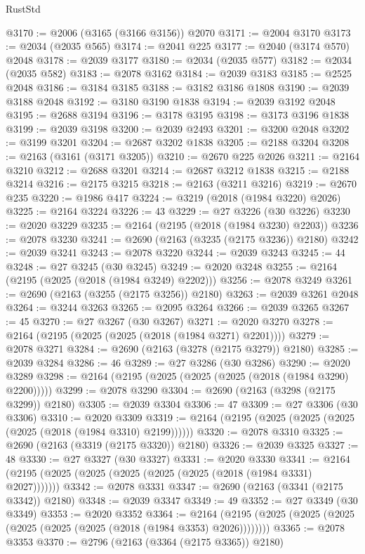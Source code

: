 \begin{lexlean}{RustStd}
\begin{coremodule}
@3170 := @2006 (@3165 (@3166 @3156)) @2070
@3171 := @2004 @3170
@3173 := @2034 (@2035 @565)
@3174 := @2041 @225
@3177 := @2040 (@3174 @570) @2048
@3178 := @2039 @3177
@3180 := @2034 (@2035 @577)
@3182 := @2034 (@2035 @582)
@3183 := @2078 @3162
@3184 := @2039 @3183
@3185 := @2525 @2048
@3186 := @3184 @3185
@3188 := @3182 @3186 @1808
@3190 := @2039 @3188 @2048
@3192 := @3180 @3190 @1838
@3194 := @2039 @3192 @2048
@3195 := @2688 @3194
@3196 := @3178 @3195
@3198 := @3173 @3196 @1838
@3199 := @2039 @3198
@3200 := @2039 @2493
@3201 := @3200 @2048
@3202 := @3199 @3201
@3204 := @2687 @3202 @1838
@3205 := @2188 @3204
@3208 := @2163 (@3161 (@3171 @3205))
@3210 := @2670 @225 @2026
@3211 := @2164 @3210
@3212 := @2688 @3201
@3214 := @2687 @3212 @1838
@3215 := @2188 @3214
@3216 := @2175 @3215
@3218 := @2163 (@3211 @3216)
@3219 := @2670 @235
@3220 := @1986 @417
@3224 := @3219 (@2018 (@1984 @3220) @2026)
@3225 := @2164 @3224
@3226 := 43
@3229 := @27 @3226 (@30 @3226)
@3230 := @2020 @3229
@3235 := @2164 (@2195 (@2018 (@1984 @3230) @2203))
@3236 := @2078 @3230
@3241 := @2690 (@2163 (@3235 (@2175 @3236)) @2180)
@3242 := @2039 @3241
@3243 := @2078 @3220
@3244 := @2039 @3243
@3245 := 44
@3248 := @27 @3245 (@30 @3245)
@3249 := @2020 @3248
@3255 := @2164 (@2195 (@2025 (@2018 (@1984 @3249) @2202)))
@3256 := @2078 @3249
@3261 := @2690 (@2163 (@3255 (@2175 @3256)) @2180)
@3263 := @2039 @3261 @2048
@3264 := @3244 @3263
@3265 := @2095 @3264
@3266 := @2039 @3265
@3267 := 45
@3270 := @27 @3267 (@30 @3267)
@3271 := @2020 @3270
@3278 := @2164 (@2195 (@2025 (@2025 (@2018 (@1984 @3271) @2201))))
@3279 := @2078 @3271
@3284 := @2690 (@2163 (@3278 (@2175 @3279)) @2180)
@3285 := @2039 @3284
@3286 := 46
@3289 := @27 @3286 (@30 @3286)
@3290 := @2020 @3289
@3298 := @2164 (@2195 (@2025 (@2025 (@2025 (@2018 (@1984 @3290) @2200)))))
@3299 := @2078 @3290
@3304 := @2690 (@2163 (@3298 (@2175 @3299)) @2180)
@3305 := @2039 @3304
@3306 := 47
@3309 := @27 @3306 (@30 @3306)
@3310 := @2020 @3309
@3319 := @2164 (@2195 (@2025 (@2025 (@2025 (@2025 (@2018 (@1984 @3310) @2199))))))
@3320 := @2078 @3310
@3325 := @2690 (@2163 (@3319 (@2175 @3320)) @2180)
@3326 := @2039 @3325
@3327 := 48
@3330 := @27 @3327 (@30 @3327)
@3331 := @2020 @3330
@3341 := @2164 (@2195 (@2025 (@2025 (@2025 (@2025 (@2025 (@2018 (@1984 @3331) @2027)))))))
@3342 := @2078 @3331
@3347 := @2690 (@2163 (@3341 (@2175 @3342)) @2180)
@3348 := @2039 @3347
@3349 := 49
@3352 := @27 @3349 (@30 @3349)
@3353 := @2020 @3352
@3364 := @2164 (@2195 (@2025 (@2025 (@2025 (@2025 (@2025 (@2025 (@2018 (@1984 @3353) @2026))))))))
@3365 := @2078 @3353
@3370 := @2796 (@2163 (@3364 (@2175 @3365)) @2180)

\end{coremodule}
\end{lexlean}
